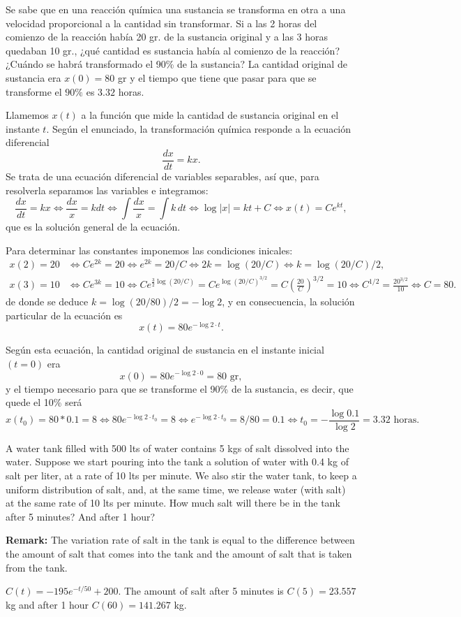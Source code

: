 {Se sabe que en una reacción química una sustancia se transforma en otra a una velocidad  proporcional a la cantidad
sin transformar. Si a las 2 horas del comienzo de la reacción había 20 gr. de la sustancia original y a las 3 horas
quedaban 10 gr., ¿qué cantidad es sustancia había al comienzo de la reacción? ¿Cuándo se habrá transformado el 90\% de
la sustancia?}
{La cantidad original de sustancia era $x(0)=80$  gr y el tiempo que tiene que pasar para que se transforme el $90\%$
es $3.32$ horas.  }
{Llamemos $x(t)$ a la función que mide la cantidad de sustancia original en el instante $t$. Según el enunciado, la
transformación química responde a la ecuación diferencial
\[
\frac{dx}{dt}=kx.
\]
Se trata de una ecuación diferencial de variables separables, así que, para resolverla separamos las variables e
integramos:
\[
\frac{dx}{dt}=kx \Leftrightarrow \frac{dx}{x}=kdt \Leftrightarrow \int \frac{dx}{x} = \int k\,dt \Leftrightarrow
\log|x| = kt+C \Leftrightarrow x(t)=Ce^{kt},
\]
que es la solución general de la ecuación.

Para determinar las constantes imponemos las condiciones inicales:
\begin{align*}
x(2)=20 &\Leftrightarrow Ce^{2k} = 20 \Leftrightarrow e^{2k} = 20/C \Leftrightarrow 2k =
\log(20/C) \Leftrightarrow k=\log(20/C)/2,\\
x(3)=10 &\Leftrightarrow Ce^{3k} = 10 \Leftrightarrow Ce^{\frac{3}{2}\log(20/C)} = Ce^{\log(20/C)^{3/2}}=
C\left(\frac{20}{C}\right)^{3/2}=10 \Leftrightarrow C^{1/2}=\frac{20^{3/2}}{10} \Leftrightarrow C = 80.
\end{align*}
de donde se deduce $k=\log(20/80)/2 = -\log 2$, y en consecuencia, la solución particular de la ecuación es
\[
x(t)=80e^{-\log2\cdot t}.
\]

Según esta ecuación, la cantidad original de sustancia en el instante inicial $(t=0)$ era
\[
x(0)=80e^{-\log2\cdot 0} = 80 \mbox{ gr},
\]
y el tiempo necesario para que se transforme el 90\% de la sustancia, es decir, que quede el 10\% será
\[
x(t_{0})=80*0.1=8 \Leftrightarrow 80e^{-\log2\cdot t_{0}}=8 \Leftrightarrow
e^{-\log2\cdot t_{0}}=8/80=0.1 \Leftrightarrow t_{0}=-\frac{\log0.1}{\log2}=3.32 \mbox{ horas.}
\]
}


{A water tank filled with 500 lts of water contains 5 kgs of salt dissolved into the water.
Suppose we start pouring into the tank a solution of water with 0.4 kg of salt per liter, at a rate of 10 lts per minute.
We also stir the water tank, to keep a uniform distribution of salt, and, at the same time, we release water (with salt) at the same rate of 10 lts per minute.
How much salt will there be in the tank after 5 minutes?
And after 1 hour?

\noindent\textbf{Remark:} The variation rate of salt in the tank is equal to the difference between the amount of salt that comes into the tank and the amount of salt that is taken from the tank.
}
{$C(t)=-195e^{-t/50}+200$. The amount of salt after 5 minutes is $C(5)=23.557$ kg and after 1 hour $C(60)=141.267$ kg.
}
{}


